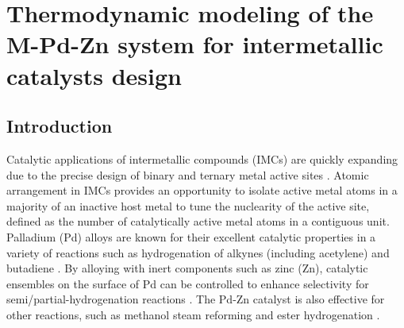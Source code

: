 \chapter{Thermodynamic modeling of the M-Pd-Zn system for intermetallic catalysts design} \label{chap:intermetallics}

\section{Introduction} \label{intermetallics:sec:intro}
Catalytic applications of intermetallic compounds (IMCs) are quickly expanding due to the precise design of binary and ternary metal active sites \cite{armbruster2014intermetallic, dasgupta2019intermetallics, furukawa2017intermetallic, armbruster2020intermetallic, yang2020intermetallic}. Atomic arrangement in IMCs provides an opportunity to isolate active metal atoms in a majority of an inactive host metal to tune the nuclearity of the active site, defined as the number of catalytically active metal atoms in a contiguous unit. Palladium (Pd) alloys are known for their excellent catalytic properties in a variety of reactions such as hydrogenation of alkynes (including acetylene) and butadiene \cite{teschner2006alkyne, zhou2016pdzn, sarkany1993hydrogenation}. By alloying with inert components such as zinc (Zn), catalytic ensembles on the surface of Pd can be controlled to enhance selectivity for semi/partial-hydrogenation reactions \cite{zhou2016pdzn, Dasgupta2022}. The Pd-Zn catalyst is also effective for other reactions, such as methanol steam reforming and ester hydrogenation \cite{conant2008stability, green1993ester}.

